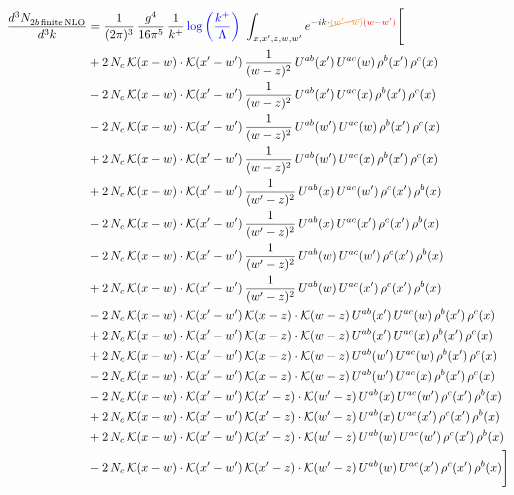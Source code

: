 \documentclass[9pt]{article}
\numberwithin{equation}{section}
\begin{document}
\begin{align}
\frac{d^{3}N_{2b\,\rm finite\, NLO}^{\rm}}{d^{3}k} & = \frac{1}{(2\pi)^{3}}\,\frac{g^{4}}{16\pi^{5}}\,\frac{1}{k^{+}}\,{\color{blue}\log{\left(\frac{k^{+}}{\Lambda}\right)}}\,\,\int_{x,x',z,w,w'}e^{-ik\cdot{\color{orange}\cancel{(w'-w)}}{\color{red}(w-w')}}\Bigg[\notag\\ & +2\,N_{c}\,\mathcal{K}(x-w)\cdot\mathcal{K}(x'-w')\,\frac{1}{(w-z)^{2}}\,U^{ab}(x')\,U^{ac}(w)\,\rho^{b}(x')\,\rho^{c}(x)\notag\\
&-2\,N_{c}\,\mathcal{K}(x-w)\cdot\mathcal{K}(x'-w')\,\frac{1}{(w-z)^{2}}\,U^{ab}(x')\,U^{ac}(x)\,\rho^{b}(x')\,\rho^{c}(x)\notag\\
&-2\,N_{c}\,\mathcal{K}(x-w)\cdot\mathcal{K}(x'-w')\,\frac{1}{(w-z)^{2}}\,U^{ab}(w')\,U^{ac}(w)\,\rho^{b}(x')\,\rho^{c}(x)\notag\\
&+2\,N_{c}\,\mathcal{K}(x-w)\cdot\mathcal{K}(x'-w')\,\frac{1}{(w-z)^{2}}\,U^{ab}(w')\,U^{ac}(x)\,\rho^{b}(x')\,\rho^{c}(x)\notag\\
&+2\,N_{c}\,\mathcal{K}(x-w)\cdot\mathcal{K}(x'-w')\,\frac{1}{(w'-z)^{2}}\,U^{ab}(x)\,U^{ac}(w')\,\rho^{c}(x')\,\rho^{b}(x)\notag\\
&-2\,N_{c}\,\mathcal{K}(x-w)\cdot\mathcal{K}(x'-w')\,\frac{1}{(w'-z)^{2}}\,U^{ab}(x)\,U^{ac}(x')\,\rho^{c}(x')\,\rho^{b}(x)\notag\\
&-2\,N_{c}\,\mathcal{K}(x-w)\cdot\mathcal{K}(x'-w')\,\frac{1}{(w'-z)^{2}}\,U^{ab}(w)\,U^{ac}(w')\,\rho^{c}(x')\,\rho^{b}(x)\notag\\
&+2\,N_{c}\,\mathcal{K}(x-w)\cdot\mathcal{K}(x'-w')\,\frac{1}{(w'-z)^{2}}\,U^{ab}(w)\,U^{ac}(x')\,\rho^{c}(x')\,\rho^{b}(x)\notag\\
&-2\,N_{c}\,\mathcal{K}(x-w)\cdot\mathcal{K}(x'-w')\,\mathcal{K}(x-z)\cdot\mathcal{K}(w-z)\,U^{ab}(x')\,U^{ac}(w)\,\rho^{b}(x')\,\rho^{c}(x)\notag\\
&+2\,N_{c}\,\mathcal{K}(x-w)\cdot\mathcal{K}(x'-w')\,\mathcal{K}(x-z)\cdot\mathcal{K}(w-z)\,U^{ab}(x')\,U^{ac}(x)\,\rho^{b}(x')\,\rho^{c}(x)\notag\\
&+2\,N_{c}\,\mathcal{K}(x-w)\cdot\mathcal{K}(x'-w')\,\mathcal{K}(x-z)\cdot\mathcal{K}(w-z)\,U^{ab}(w')\,U^{ac}(w)\,\rho^{b}(x')\,\rho^{c}(x)\notag\\
&-2\,N_{c}\,\mathcal{K}(x-w)\cdot\mathcal{K}(x'-w')\,\mathcal{K}(x-z)\cdot\mathcal{K}(w-z)\,U^{ab}(w')\,U^{ac}(x)\,\rho^{b}(x')\,\rho^{c}(x)\notag\\
&-2\,N_{c}\,\mathcal{K}(x-w)\cdot\mathcal{K}(x'-w')\,\mathcal{K}(x'-z)\cdot\mathcal{K}(w'-z)\,U^{ab}(x)\,U^{ac}(w')\,\rho^{c}(x')\,\rho^{b}(x)\notag\\
&+2\,N_{c}\,\mathcal{K}(x-w)\cdot\mathcal{K}(x'-w')\,\mathcal{K}(x'-z)\cdot\mathcal{K}(w'-z)\,U^{ab}(x)\,U^{ac}(x')\,\rho^{c}(x')\,\rho^{b}(x)\notag\\
&+2\,N_{c}\,\mathcal{K}(x-w)\cdot\mathcal{K}(x'-w')\,\mathcal{K}(x'-z)\cdot\mathcal{K}(w'-z)\,U^{ab}(w)\,U^{ac}(w')\,\rho^{c}(x')\,\rho^{b}(x)\notag\\
&-2\,N_{c}\,\mathcal{K}(x-w)\cdot\mathcal{K}(x'-w')\,\mathcal{K}(x'-z)\cdot\mathcal{K}(w'-z)\,U^{ab}(w)\,U^{ac}(x')\,\rho^{c}(x')\,\rho^{b}(x)\Bigg]
\end{align}
\end{document}

